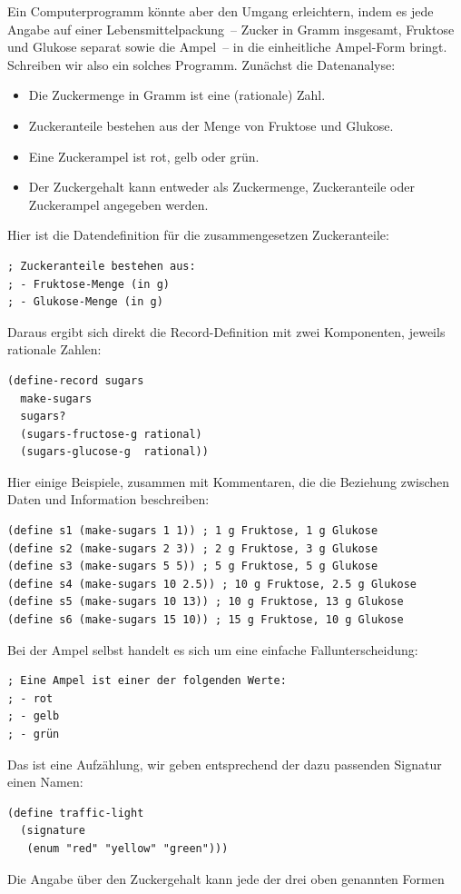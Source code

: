 Ein Computerprogramm könnte aber den Umgang erleichtern, indem es jede
Angabe auf einer Lebensmittelpackung~-- Zucker in Gramm insgesamt,
Fruktose und Glukose separat sowie die Ampel~-- in die einheitliche
Ampel-Form bringt.  Schreiben wir also ein solches Programm.  Zunächst
die Datenanalyse:
%
\begin{itemize}
\item Die Zuckermenge in Gramm ist eine (rationale) Zahl.
\item Zuckeranteile bestehen aus der Menge von Fruktose und Glukose.
\item Eine Zuckerampel ist rot, gelb oder grün.
\item Der Zuckergehalt kann entweder als Zuckermenge, Zuckeranteile
  oder Zuckerampel angegeben werden.
\end{itemize}
%
Hier ist die Datendefinition für die zusammengesetzen Zuckeranteile:
%
\begin{lstlisting}
; Zuckeranteile bestehen aus:
; - Fruktose-Menge (in g)
; - Glukose-Menge (in g)
\end{lstlisting}
%
Daraus ergibt sich direkt die Record-Definition mit zwei Komponenten,
jeweils rationale Zahlen:
%
\begin{lstlisting}
(define-record sugars
  make-sugars
  sugars?
  (sugars-fructose-g rational)
  (sugars-glucose-g  rational))
\end{lstlisting}
%
Hier einige Beispiele, zusammen mit Kommentaren, die die Beziehung
zwischen Daten und Information beschreiben:
%
\begin{lstlisting}
(define s1 (make-sugars 1 1)) ; 1 g Fruktose, 1 g Glukose
(define s2 (make-sugars 2 3)) ; 2 g Fruktose, 3 g Glukose
(define s3 (make-sugars 5 5)) ; 5 g Fruktose, 5 g Glukose
(define s4 (make-sugars 10 2.5)) ; 10 g Fruktose, 2.5 g Glukose
(define s5 (make-sugars 10 13)) ; 10 g Fruktose, 13 g Glukose
(define s6 (make-sugars 15 10)) ; 15 g Fruktose, 10 g Glukose
\end{lstlisting}
%
Bei der Ampel selbst handelt es sich um eine einfache
Fallunterscheidung:
%
\begin{lstlisting}
; Eine Ampel ist einer der folgenden Werte:
; - rot
; - gelb
; - grün
\end{lstlisting}
%
Das ist eine Aufzählung, wir geben entsprechend der dazu passenden
Signatur einen Namen:
%
\begin{lstlisting}
(define traffic-light
  (signature
   (enum "red" "yellow" "green")))
\end{lstlisting}
%
Die Angabe über den Zuckergehalt kann jede der drei oben genannten Formen
